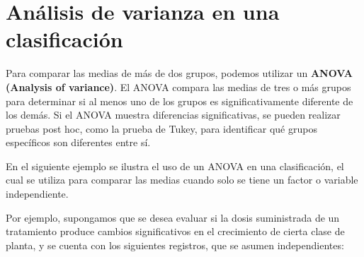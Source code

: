 \documentclass[
]{book}
\begin{document}
\hypertarget{anuxe1lisis-de-varianza-en-una-clasificaciuxf3n}{%
\chapter{Análisis de varianza en una clasificación}\label{anuxe1lisis-de-varianza-en-una-clasificaciuxf3n}}

Para comparar las medias de más de dos grupos, podemos utilizar un \textbf{ANOVA (Analysis of variance)}. El ANOVA compara las medias de tres o más grupos para determinar si al menos uno de los grupos es significativamente diferente de los demás. Si el ANOVA muestra diferencias significativas, se pueden realizar pruebas post hoc, como la prueba de Tukey, para identificar qué grupos específicos son diferentes entre sí.

En el siguiente ejemplo se ilustra el uso de un ANOVA en una clasificación, el cual se utiliza para comparar las medias cuando solo se tiene un factor o variable independiente.

Por ejemplo, supongamos que se desea evaluar si la dosis suministrada de un tratamiento produce cambios significativos en el crecimiento de cierta clase de planta, y se cuenta con los siguientes registros, que se asumen independientes:
\end{document}
